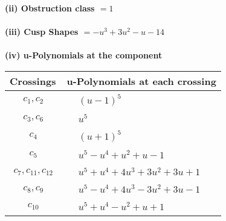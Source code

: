 \documentclass[1p]{elsarticle_modified}
\theoremstyle{definition}
\begin{document}
\flushleft \textbf{(ii) Obstruction class $= 1$}\\~\\
\flushleft \textbf{(iii) Cusp Shapes $= - u^3+3 u^2- u-14$}\\~\\
\newpage\renewcommand{\arraystretch}{1}
\flushleft \textbf{(iv) u-Polynomials at the component}\newline \\
\begin{tabular}{m{50pt}|m{274pt}}
Crossings & \hspace{64pt}u-Polynomials at each crossing \\
\hline $$\begin{aligned}c_{1},c_{2}\end{aligned}$$&$\begin{aligned}
&(u-1)^5
\end{aligned}$\\
\hline $$\begin{aligned}c_{3},c_{6}\end{aligned}$$&$\begin{aligned}
&u^5
\end{aligned}$\\
\hline $$\begin{aligned}c_{4}\end{aligned}$$&$\begin{aligned}
&(u+1)^5
\end{aligned}$\\
\hline $$\begin{aligned}c_{5}\end{aligned}$$&$\begin{aligned}
&u^5- u^4+u^2+u-1
\end{aligned}$\\
\hline $$\begin{aligned}c_{7},c_{11},c_{12}\end{aligned}$$&$\begin{aligned}
&u^5+u^4+4 u^3+3 u^2+3 u+1
\end{aligned}$\\
\hline $$\begin{aligned}c_{8},c_{9}\end{aligned}$$&$\begin{aligned}
&u^5- u^4+4 u^3-3 u^2+3 u-1
\end{aligned}$\\
\hline $$\begin{aligned}c_{10}\end{aligned}$$&$\begin{aligned}
&u^5+u^4- u^2+u+1
\end{aligned}$\\
\hline
\end{tabular}\\~\\
\end{document}
